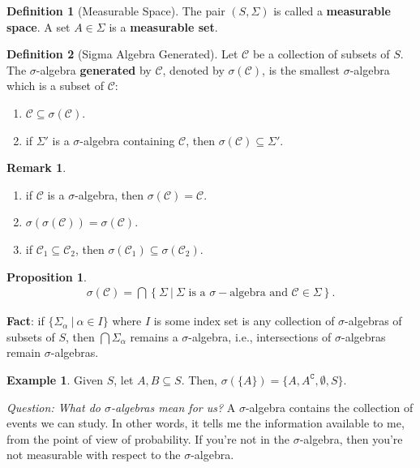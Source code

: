 \documentclass[11pt]{article}
\theoremstyle{definition}
\newtheorem{ex}{Example}[section]
\newtheorem{defn}{Definition}[section]
\newtheorem{rmk}{Remark}[section]
\newtheorem{prop}{Proposition}[section]
\theoremstyle{theorem}
\newcommand{\comp}[1]{{#1}^{\texttt{C}}}
\begin{document}
\begin{defn}[Measurable Space]
	The pair \( (S, \Sigma) \) is called a \textbf{measurable space}. A set \( A \in \Sigma \) is a \textbf{measurable set}.
\end{defn}

\begin{defn}[Sigma Algebra Generated]
	Let \( \mathcal{C} \) be a collection of subsets of \( S \). The \( \sigma \)-algebra \textbf{generated} by \( \mathcal{C} \), denoted by \( \sigma ( \mathcal{C}) \), is the smallest \( \sigma \)-algebra which is a subset of \( \mathcal{C} \):
	\begin{enumerate}[noitemsep]
		\item \( \mathcal{C} \subseteq \sigma ( \mathcal{C}) \).
		\item if \( \Sigma' \) is a \( \sigma \)-algebra containing \( \mathcal{C} \), then \( \sigma ( \mathcal{C} ) \subseteq \Sigma' \).
	\end{enumerate}
\end{defn}

\begin{rmk}
\begin{enumerate}[noitemsep]
	\item if \( \mathcal{C} \) is a \( \sigma \)-algebra, then \( \sigma( \mathcal{C} ) = \mathcal{C} \).
	\item \( \sigma ( \sigma ( \mathcal{C} )) = \sigma ( \mathcal{C} ) \).
	\item if \( \mathcal{C}_1 \subseteq \mathcal{C}_2 \), then \( \sigma (\mathcal{C}_1) \subseteq \sigma (\mathcal{C}_2 ) \).
\end{enumerate}	
\end{rmk}

\begin{prop}
\begin{align}
	\sigma ( \mathcal{C} ) = \bigcap \left\{  \Sigma\ |\ \Sigma \text{ is a } \sigma-\text{algebra and } \mathcal{C} \in \Sigma \right\}.
\end{align}	
\end{prop}

\textbf{Fact}: if \( \{ \Sigma_\alpha\ |\ \alpha \in I \} \) where \( I \) is some index set is any collection of \( \sigma \)-algebras of subsets of \( S \), then \( \bigcap \Sigma_\alpha \) remains a \( \sigma \)-algebra, i.e., intersections of \( \sigma \)-algebras remain \( \sigma \)-algebras. 

\begin{ex}
Given \( S \), let \( A, B \subseteq S \). Then, \( \sigma ( \{ A \} 	)  = \{ A, \comp{A}, \emptyset, S \} \).
\end{ex}
\emph{Question: What do \( \sigma \)-algebras mean for us?} 
\newline
\newline
A \( \sigma \)-algebra contains the collection of events we can study. In other words, it tells me the information available to me, from the point of view of probability. If you're not in the \( \sigma \)-algebra, then you're not measurable with respect to the \( \sigma \)-algebra. 
\end{document}
